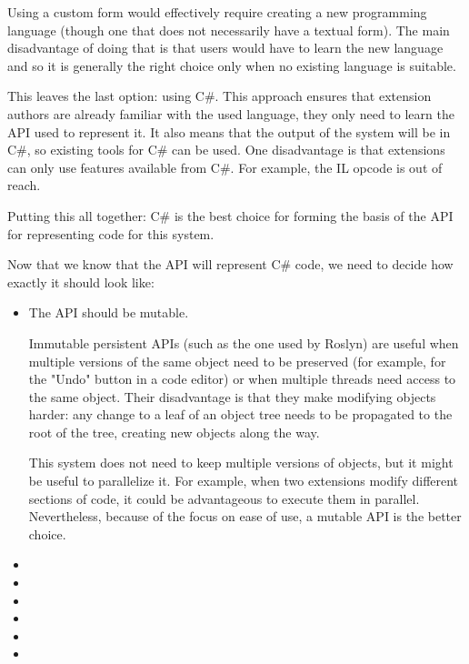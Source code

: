 Using a custom form would effectively require creating a new programming language (though one that does not necessarily have a textual form). The main disadvantage of doing that is that users would have to learn the new language and so it is generally the right choice only when no existing language is suitable.

This leaves the last option: using C\#. This approach ensures that extension authors are already familiar with the used language, they only need to learn the \ac{API} used to represent it. It also means that the output of the system will be in C\#, so existing tools for C\# can be used. One disadvantage is that extensions can only use features available from C\#. For example, the  \ac{IL} opcode is out of reach.

Putting this all together: C\# is the best choice for forming the basis of the \ac{API} for representing code for this system.

\medskip

Now that we know that the \ac{API} will represent C\# code, we need to decide how exactly it should look like:


\begin{itemize}
\item The \ac{API} should be mutable.

Immutable persistent \acp{API} (such as the one used by Roslyn) are useful when multiple versions of the same object need to be preserved (for example, for the "Undo" button in a code editor) or when multiple threads need access to the same object. Their disadvantage is that they make modifying objects harder: any change to a leaf of an object tree needs to be propagated to the root of the tree, creating new objects along the way.

This system does not need to keep multiple versions of objects, but it might be useful to parallelize it. For example, when two extensions modify different sections of code, it could be advantageous to execute them in parallel. Nevertheless, because of the focus on ease of use, a mutable \ac{API} is the better choice.

\item {}
\item {}
\item {}
\item {}
\item {}
\item {}
\end{itemize}
